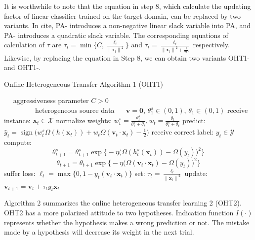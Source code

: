 \documentclass[letterpaper]{article}
\DeclareMathOperator{\sign}{sign}
\begin{document}
It is worthwhile to note that the equation in step 8, which calculate the updating factor of linear classifier trained on the target domain, can be replaced by two variants.
In cite, PA-\uppercase\expandafter{} introduces a non-negative linear slack variable into PA, and PA-\uppercase\expandafter{} introduces a quadratic slack variable.
The corresponding equations of calculation of $\tau$ are $\tau_t = \min \{ C, \frac{\ell_t}{{\|\mathbf{x}_t\|}^2} \} $ and $ \tau_t = \frac{\ell_t}{{\|\mathbf{x}_t\|}^2 + \frac{1}{2C}} $ respectively.
Likewise, by replacing the equation in Step 8, we can obtain two variants OHT1-\uppercase\expandafter{} and OHT1-\uppercase\expandafter{}.

\begin{algorithm}
\begin{algorithmic}[1]
\caption{Online Heterogeneous Transfer Algorithm 1 (OHT1)}
\REQUIRE ~~
aggressiveness parameter $C>0$\\ 
~~~~~~~~~heterogeneous source data
\ENSURE ~~
$\mathbf{v} = \mathbf{0}$, $\theta_{1}^{s} \in (0,1)$, $\theta_{1} \in (0,1)$
\STATE 
  receive instance: $\mathbf{x}_t \in \mathcal{X}$
\STATE
  normalize weights: $w_{t}^{s} = \frac{\theta_{t}^{s}}{\theta_{t}^{s}+\theta_t}, w_{t} = \frac{\theta_{t}}{\theta_{t}^{s}+\theta_t}$
\STATE
  predict: $\hat{y}_t = \sign \big( w_{t}^{s} \varOmega (h(\mathbf{x}_t)) + w_{t} \varOmega (\mathbf{v}_t \cdot \mathbf{x}_t) - \frac{1}{2} \big)$
\STATE
  receive correct label: $y_t \in \mathcal{Y}$
\STATE
  compute: 
    $$\theta_{t+1}^{s} = \theta_{t+1}^{s} \exp \big\{ -\eta \big(\varOmega(h_{t}^{s}(\mathbf{x}_t)) - \varOmega(y_t)\big)^2 \big\} $$
    $$\theta_{t+1} = \theta_{t+1} \exp \big\{ -\eta \big(\varOmega(\mathbf{v}_t \cdot \mathbf{x}_t) - \varOmega(y_t)\big)^2 \big\} $$
\STATE
  suffer loss: $\ell_t = \max \{0, 1-y_t(\mathbf{v}_t \cdot \mathbf{x}_t)\}$
\STATE
  set: $\tau_t = \frac{\ell_t}{{\|\mathbf{x}_t\|}^2}$
\STATE
  update: $ \mathbf{v}_{t+1} = \mathbf{v}_t + \tau_t y_t \mathbf{x}_t $
\ENDFOR
\end{algorithmic}
\end{algorithm}

Algorithm 2 summarizes the online heterogeneous transfer learning 2 (OHT2).
OHT2 has a more polarized attitude to two hypotheses.
Indication function $I(\cdot)$ represents whether the hypothesis makes a wrong prediction or not.
The mistake made by a hypothesis will decrease its weight in the next trial.
\end{document}
